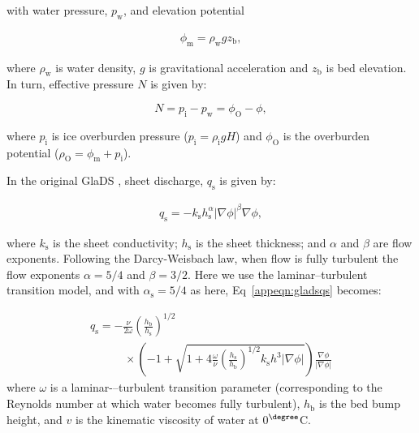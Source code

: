 \documentclass[tc, manuscript]{copernicus}
\begin{document}
with water pressure, $p_{\mathrm{w}}$, and elevation potential

\begin{equation}
\label{eq:elevationpotential}
\begin{aligned}
\phi_{\mathrm{m}} = \rho_{\mathrm{w}}gz_{\mathrm{b}},
\end{aligned}
\end{equation}

where $\rho_{\mathrm{w}}$ is water density, $g$ is gravitational acceleration and $z_{\mathrm{b}}$ is bed elevation. In turn, effective pressure $N$ is given by: 

\begin{equation}
\label{appeqn}
N = p_{\mathrm{i}}-p_{\mathrm{w}} = \phi_{\mathrm{O}}-\phi,
\end{equation}

where $p_{\mathrm{i}}$ is ice overburden pressure ($p_{\mathrm{i}} = \rho_{\mathrm{i}}gH$) and $\phi_{\mathrm{O}}$ is the overburden potential ($\rho_{\mathrm{O}} = \phi_{\mathrm{m}}+p_{\mathrm{i}}$).

In the original GlaDS \citep{werder2013modeling}, sheet discharge, $q_{\mathrm{s}}$ is given by:

\begin{equation}
\label{appeqn:gladsqs}
\begin{aligned}
q_{\mathrm{s}} = -k_{\mathrm{s}}h_{\mathrm{s}}^{\alpha}|\nabla \phi|^{\beta}\nabla \phi,
\end{aligned}
\end{equation}

where $k_{\mathrm{s}}$ is the sheet conductivity; $h_{\mathrm{s}}$ is the sheet thickness; and $\alpha$ and $\beta$ are flow exponents. Following the Darcy-Weisbach law, when flow is fully turbulent the flow exponents $\alpha=\mathrm{5/4}$ and $\beta=\mathrm{3/2}$. Here we use the \citet{hill2024improved} laminar--turbulent transition model, and with $\alpha_{\mathrm{s}}= \mathrm{5/4}$ as here, Eq~\ref{appeqn:gladsqs} becomes:  

\begin{equation}
\label{appeqn: Transition}
\begin{aligned}
q_{\mathrm{s}} = -\frac{\nu}{2 \omega} \left(\frac{h_{\mathrm{b}}}{h_{\mathrm{s}}}\right)^{1 / 2} \hspace{10em}\\
\hspace{3em} \times \left(-1 + \sqrt{1 + 4 \frac{\omega}{\nu} \left(\frac{h_{\mathrm{s}}}{h_{\mathrm{b}}}\right)^{1 / 2} k_{\mathrm{s}} h^3 |\nabla \phi|} \right) \frac{\nabla \phi}{|\nabla \phi|}
\end{aligned}
\end{equation}
where $\omega$ is a laminar-–turbulent transition parameter (corresponding to the Reynolds number at which water becomes fully turbulent), $h_{\mathrm{b}}$ is the bed bump height, and $v$ is the kinematic viscosity of water at 0$^{\degree}$C. 
\end{document}
